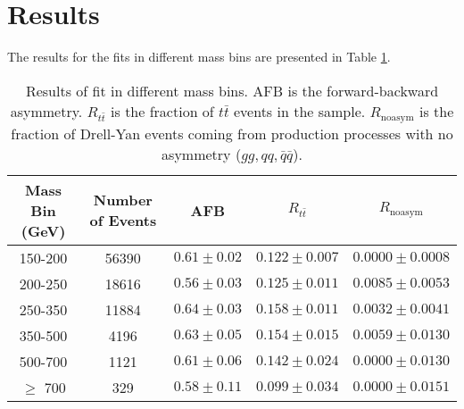 \documentclass[
10pt, %
a4paper, %
oneside, %
headinclude,footinclude, %
BCOR5mm, %
]{scrartcl}
\begin{document}

\section{Results}

The results for the fits in different mass bins are presented in Table \ref{tab:results}.


\begin{table}[htp]
    \centering
    \label{tab:results}

 \caption{ Results of fit in different mass bins. AFB is the forward-backward asymmetry.
 $R_{t\bar{t}}$ is the fraction of $t\bar{t}$ events in the sample.
 $R_{\text{noasym}}$ is the fraction of Drell-Yan events coming from production processes with no asymmetry 
 ($gg, qq, \bar{q}\bar{q}$).}
\begin{tabular}{|| c | c | c | c | c ||}
    \hline
    Mass Bin (GeV)  & Number of Events &  
    AFB & $R_{t \bar{t}}$ & $R_{\text{noasym}}$  \\
 \hline \hline
 150-200 & 56390 & $0.61 \pm 0.02$ & $0.122 \pm 0.007$ & $0.0000 \pm 0.0008$  \\
 200-250 & 18616 & $0.56 \pm 0.03$ & $0.125 \pm 0.011$ & $0.0085 \pm 0.0053$ \\
 250-350 & 11884 & $0.64 \pm 0.03$ & $0.158 \pm 0.011$ & $0.0032 \pm 0.0041$ \\
 350-500 & 4196 & $0.63 \pm 0.05$ & $0.154 \pm 0.015$  & $0.0059 \pm 0.0130$ \\
 500-700 & 1121 & $0.61 \pm 0.06$ & $0.142 \pm 0.024$  & $0.0000 \pm 0.0130$ \\
 $\geq$ 700 & 329 & $0.58 \pm 0.11$ & $0.099 \pm 0.034$ & $0.0000 \pm 0.0151$ \\



 \hline

 \end{tabular}

\end{table}

    


\end{document}

